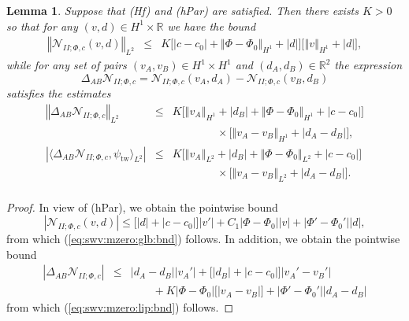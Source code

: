 \documentclass[10pt]{articleHJ}
\newcommand{\Real}{\mathbb{R}}							%
\newcommand{\abs}[1]{\left\vert#1\right\vert}			%
\newcommand{\norm}[1]{\left\Vert#1\right\Vert}		%
\newcommand{\sref}[1]{(\ref{#1})}                       %
\newtheorem{lem}[thm]{Lemma}
\numberwithin{equation}{section}
\begin{document}
\begin{lem}
\label{lem:swv:mzero}
Suppose that (Hf) and (hPar) are satisfied.
Then there exists $K > 0$ so that
for any $(v, d) \in H^1 \times \Real$
we have the bound
\begin{equation}
\label{eq:swv:mzero:glb:bnd}
\begin{array}{lcl}
 \norm{\mathcal{N}_{II;\Phi, c}(v, d)}_{L^2}
  & \le &
    K \big[
   \abs{c - c_0} + \norm{ \Phi- \Phi_0}_{H^1}
   + \abs{d}
  \big] \big[
    \norm{v}_{H^1} + \abs{d}
  \big] ,
\end{array}
\end{equation}
while for any set of pairs $(v_A, v_B) \in H^1 \times H^1$
and $(d_A, d_B) \in \Real^2$
the expression
\begin{equation}
\Delta_{AB} \mathcal{N}_{II;\Phi, c}
 =  \mathcal{N}_{II;\Phi, c}(v_A, d_A)
 - \mathcal{N}_{II;\Phi, c}(v_B, d_B)
\end{equation}
satisfies the estimates
\begin{equation}
\label{eq:swv:mzero:lip:bnd}
\begin{array}{lcl}
\norm{ \Delta_{AB} \mathcal{N}_{II;\Phi, c}  }_{L^2}
  & \le &
 K \big[
  \norm{v_A}_{H^1} + \abs{d_B}
   +  \norm{\Phi - \Phi_0}_{H^1}
  + \abs{c - c_0} \big]
\\[0.2cm]
& & \qquad \qquad \times
  \big[
     \norm{v_A-v_B}_{H^1}
      + \abs{d_A - d_B}
  \big] ,
\\[0.2cm]
%
\abs{\langle \Delta_{AB} \mathcal{N}_{II;\Phi, c} , \psi_{\mathrm{tw}} \rangle_{L^2} }
 & \le &
 K \big[
  \norm{v_A}_{L^2} + \abs{d_B}
   +  \norm{\Phi - \Phi_0}_{L^2}
  + \abs{c - c_0} \big]
\\[0.2cm]
& & \qquad \qquad \times
  \big[
     \norm{v_A-v_B}_{L^2}
      + \abs{d_A  - d_B}
  \big] .
\\[0.2cm]
\end{array}
\end{equation}
\end{lem}
\begin{proof}
In view of (hPar), we obtain
the pointwise bound
\begin{equation}
\abs{\mathcal{N}_{II;\Phi, c}(v, d)}
\le
\big[ \abs{d} + \abs{c -c_0} \big] \abs{v'}
+ C_1 \abs{\Phi - \Phi_0}
  \abs{v}
  + \abs{\Phi' - \Phi_0'}
    \abs{d},
\end{equation}
from which \sref{eq:swv:mzero:glb:bnd}
follows.
In addition, we obtain the pointwise bound
\begin{equation}
\begin{array}{lcl}
\abs{\Delta_{AB} \mathcal{N}_{II;\Phi, c} }
& \le &
\abs{d_A - d_B } \abs{v_A'}
+ \big[
 \abs{d_B}
+ \abs{c - c_0} \big] \abs{v_A' - v_B'}
\\[0.2cm]
& & \qquad
+ K \abs{\Phi - \Phi_0 }
  \big[
  \abs{v_A-v_B}
  \big]
  + \abs{\Phi' - \Phi_0'}
   \abs{d_A - d_B}
\end{array}
\end{equation}
from which
\sref{eq:swv:mzero:lip:bnd} follows.
\end{proof}
\end{document}
